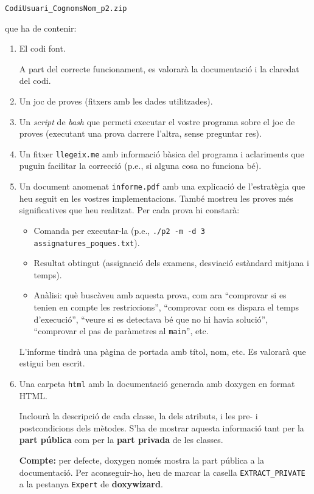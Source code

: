 \documentclass[10pt,a4paper]{../documents/class_material_assignatura_udg}
\begin{document}
\begin{center}
	\texttt{CodiUsuari\_CognomsNom\_p2.zip}
\end{center}

\noindent que ha de contenir:

\begin{enumerate}

	\item El codi font.
	
	A part del correcte funcionament, es valorarà la documentació i la claredat del codi.

	\item Un joc de proves (fitxers amb les dades utilitzades).

	\item Un \textit{script} de \textit{bash} que permeti executar el vostre programa sobre el joc de proves (executant una prova darrere l'altra, sense preguntar res).

	\item Un fitxer \texttt{llegeix.me} amb informació bàsica del programa i aclariments que puguin facilitar la correcció (p.e., si alguna cosa no funciona bé).
	
	\item\label{informe} Un document anomenat \texttt{informe.pdf} amb una explicació de l'estratègia que heu seguit en les vostres implementacions. També mostreu les proves més significatives que heu realitzat. Per cada prova hi constarà:
	
	\begin{itemize}
	    \item Comanda per executar-la (p.e., \texttt{./p2 -m -d 3 assignatures\_poques.txt}).
	    \item Resultat obtingut (assignació dels examens, desviació estàndard mitjana i temps).
	    \item Anàlisi: què buscàveu amb aquesta prova, com ara ``comprovar si es tenien en compte les restriccions'', ``comprovar com es dispara el temps d'execució'', ``veure si es detectava bé que no hi havia solució'', ``comprovar el pas de paràmetres al \texttt{main}'', etc.
	\end{itemize}
	 L'informe tindrà una pàgina de portada amb títol, nom, etc. Es valorarà que estigui ben escrit.

	\item\label{doxygen} Una carpeta \texttt{html} amb la documentació generada amb {\sf doxygen} en format HTML.

    Inclourà la descripció de cada classe, la dels atributs, i les pre- i postcondicions dels mètodes. S'ha de mostrar aquesta informació tant per la \textbf{part pública} com per la \textbf{part privada} de les classes.
    
    \textbf{Compte:} per defecte, {\sf doxygen} només mostra la part pública a la documentació. Per aconseguir-ho, heu de marcar la casella \texttt{EXTRACT\_PRIVATE} a la pestanya \texttt{Expert} de {\bf doxywizard}.

\end{enumerate}
\end{document}
